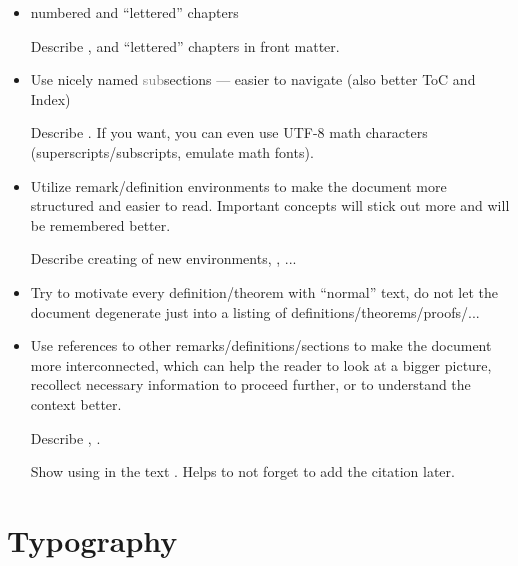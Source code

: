 \begin{itemize}
    \item numbered and \enquote{lettered} chapters
          \begin{Todo}
              Describe \custommacro{\chapternotnumbered}, and \enquote{lettered} chapters in front matter.
          \end{Todo}
    \item Use nicely named \textcolor{gray}{sub}sections --- easier to navigate (also better ToC and Index)
          \begin{Todo}
              Describe \macro{\texorpdfstring}.
              If you want, you can even use UTF-8 math characters (superscripts/subscripts, emulate math fonts).
          \end{Todo}
    \item Utilize remark/definition environments to make the document more structured and easier to read.
          Important concepts will stick out more and will be remembered better.
          \begin{Todo}
              Describe creating of new environments, \custommacro{\qedhere}, ...
          \end{Todo}
    \item Try to motivate every definition/theorem with \enquote{normal} text, do not let the document degenerate just into a listing of definitions/theorems/proofs/...
    \item Use references to other remarks/definitions/sections to make the document more interconnected, which can help the reader to look at a bigger picture, recollect necessary information to proceed further, or to understand the context better.
          \begin{Todo}
              Describe \custommacro{\Cref}, \custommacro{\Nref}.
          \end{Todo}
          \begin{Todo}
              Show using  in the text \autocite{TODO}.
              Helps to not forget to add the citation later.
          \end{Todo}
\end{itemize}


\section{Typography}%
\label{sec:Typography}

